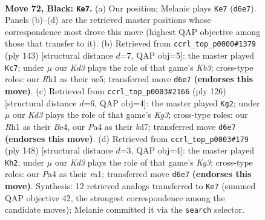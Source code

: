 \documentclass[11pt]{article}
\begin{document}
\clearpage

\begin{figure}[p]\centering
\begin{subfigure}{0.46\textwidth}\centering
\resizebox{\linewidth}{!}{%
\newchessgame
\chessboard[
  setfen={8/8/3k4/2pp4/p7/8/2K5/7r b - - 1 72},
  showmover=false,
  pgfstyle=straightmove, color=movearrow, markmove={d6-e7}
]}
\caption{}
\end{subfigure}\hfill
\begin{subfigure}{0.46\textwidth}\centering
\resizebox{\linewidth}{!}{%
\newchessgame
\chessboard[
  setfen={8/8/1k6/1pp1N3/8/p7/P1K5/8 b - - 0 72},
  showmover=false,
  pgfstyle=straightmove, color=movearrow, markmove={b6-c7}
]}
\caption{}
\end{subfigure}
\\[4pt]
\begin{subfigure}{0.46\textwidth}\centering
\resizebox{\linewidth}{!}{%
\newchessgame
\chessboard[
  setfen={8/3b2k1/8/8/4BP1P/6K1/8/8 w - - 3 64},
  showmover=false,
  pgfstyle=straightmove, color=movearrow, markmove={g3-g2}
]}
\caption{}
\end{subfigure}\hfill
\begin{subfigure}{0.46\textwidth}\centering
\resizebox{\linewidth}{!}{%
\newchessgame
\chessboard[
  setfen={8/3R4/6k1/8/7P/5PK1/8/r7 w - - 5 75},
  showmover=false,
  pgfstyle=straightmove, color=movearrow, markmove={g3-h2}
]}
\caption{}
\end{subfigure}
\caption{\textbf{Move 72, Black: \texttt{Ke7}.} (a) Our position; Melanie plays \texttt{Ke7} (\texttt{d6e7}). Panels (b)--(d) are the retrieved master positions whose correspondence most drove this move (highest QAP objective among those that transfer to it). (b) Retrieved from \texttt{ccrl\_top\_p0000\#1379} (ply 143) [structural distance $d$=7, QAP obj=5]: the master played \texttt{Kc7}; under $\mu$ our \emph{Kd3} plays the role of that game's \emph{Kb3}; cross-type roles: our \emph{R}h1 as their \emph{n}e5; transferred move \texttt{d6e7} \textbf{(endorses this move)}. (c) Retrieved from \texttt{ccrl\_top\_p0003\#2166} (ply 126) [structural distance $d$=6, QAP obj=4]: the master played \texttt{Kg2}; under $\mu$ our \emph{Kd3} plays the role of that game's \emph{Kg3}; cross-type roles: our \emph{R}h1 as their \emph{B}e4, our \emph{P}a4 as their \emph{b}d7; transferred move \texttt{d6e7} \textbf{(endorses this move)}. (d) Retrieved from \texttt{ccrl\_top\_p0003\#179} (ply 148) [structural distance $d$=3, QAP obj=4]: the master played \texttt{Kh2}; under $\mu$ our \emph{Kd3} plays the role of that game's \emph{Kg3}; cross-type roles: our \emph{P}a4 as their \emph{r}a1; transferred move \texttt{d6e7} \textbf{(endorses this move)}. Synthesis: 12 retrieved analogs transferred to \texttt{Ke7} (summed QAP objective 42, the strongest correspondence among the candidate moves); Melanie committed it via the \texttt{search} selector.}
\label{fig:thought-m143}
\end{figure}
\end{document}
